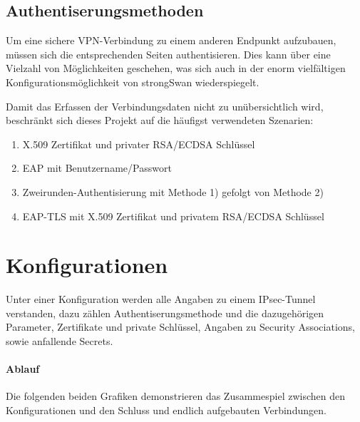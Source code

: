 \subsection{Authentiserungsmethoden}
Um eine sichere VPN-Verbindung zu einem anderen Endpunkt aufzubauen, müssen sich die entsprechenden Seiten authentisieren. Dies kann über eine Vielzahl von Möglichkeiten geschehen, was sich auch in der enorm vielfältigen Konfigurationsmöglichkeit von strongSwan wiederspiegelt.

Damit das Erfassen der Verbindungsdaten nicht zu unübersichtlich wird, beschränkt sich dieses Projekt auf die häufigst verwendeten Szenarien:

\begin{enumerate}
	\item X.509 Zertifikat und privater RSA/ECDSA Schlüssel
	\item EAP mit Benutzername/Passwort
	\item Zweirunden-Authentisierung mit Methode 1) gefolgt von Methode 2)
	\item EAP-TLS mit X.509 Zertifikat und privatem RSA/ECDSA Schlüssel
\end{enumerate}

\newpage
\section{Konfigurationen}
Unter einer Konfiguration werden alle Angaben zu einem IPsec-Tunnel verstanden, dazu zählen Authentiserungsmethode und die dazugehörigen Parameter, Zertifikate und private Schlüssel, Angaben zu  Security Associations, sowie anfallende Secrets.

\paragraph{Ablauf} Die folgenden beiden Grafiken demonstrieren das Zusammespiel zwischen den Konfigurationen und den Schluss und endlich aufgebauten Verbindungen. 

